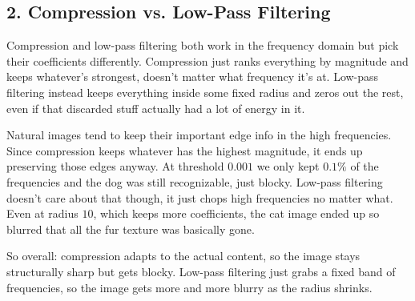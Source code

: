 \subsection*{2. Compression vs. Low-Pass Filtering}

Compression and low-pass filtering both work in the frequency domain but pick their coefficients differently. Compression just ranks everything by magnitude and keeps whatever's strongest, doesn't matter what frequency it's at. Low-pass filtering instead keeps everything inside some fixed radius and zeros out the rest, even if that discarded stuff actually had a lot of energy in it.

Natural images tend to keep their important edge info in the high frequencies. Since compression keeps whatever has the highest magnitude, it ends up preserving those edges anyway. At threshold $0.001$ we only kept $0.1\%$ of the frequencies and the dog was still recognizable, just blocky. Low-pass filtering doesn't care about that though, it just chops high frequencies no matter what. Even at radius $10$, which keeps more coefficients, the cat image ended up so blurred that all the fur texture was basically gone.

So overall: compression adapts to the actual content, so the image stays structurally sharp but gets blocky. Low-pass filtering just grabs a fixed band of frequencies, so the image gets more and more blurry as the radius shrinks.
